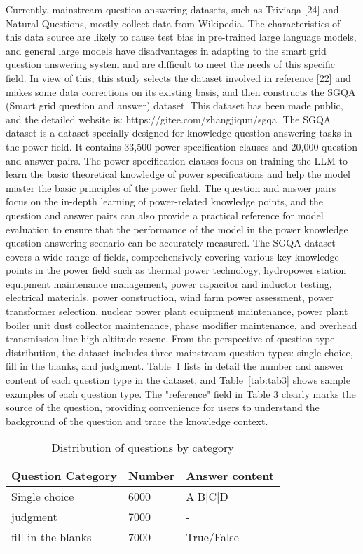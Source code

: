 Currently, mainstream question answering datasets, such as Triviaqa [24] and Natural Questions, mostly collect data from Wikipedia. The characteristics of this data source are likely to cause test bias in pre-trained large language models, and general large models have disadvantages in adapting to the smart grid question answering system and are difficult to meet the needs of this specific field.
In view of this, this study selects the dataset involved in reference [22] and makes some data corrections on its existing basis, and then constructs the SGQA (Smart grid question and answer) dataset. This dataset has been made public, and the detailed website is: https://gitee.com/zhangjiqun/sgqa.
The SGQA dataset is a dataset specially designed for knowledge question answering tasks in the power field. It contains 33,500 power specification clauses and 20,000 question and answer pairs. The power specification clauses focus on training the LLM to learn the basic theoretical knowledge of power specifications and help the model master the basic principles of the power field. The question and answer pairs focus on the in-depth learning of power-related knowledge points, and the question and answer pairs can also provide a practical reference for model evaluation to ensure that the performance of the model in the power knowledge question answering scenario can be accurately measured.
The SGQA dataset covers a wide range of fields, comprehensively covering various key knowledge points in the power field such as thermal power technology, hydropower station equipment maintenance management, power capacitor and inductor testing, electrical materials, power construction, wind farm power assessment, power transformer selection, nuclear power plant equipment maintenance, power plant boiler unit dust collector maintenance, phase modifier maintenance, and overhead transmission line high-altitude rescue. From the perspective of question type distribution, the dataset includes three mainstream question types: single choice, fill in the blanks, and judgment. Table~\ref{tab:tab2} lists in detail the number and answer content of each question type in the dataset, and Table~\ref{tab:tab3}  shows sample examples of each question type. The "reference" field in Table 3 clearly marks the source of the question, providing convenience for users to understand the background of the question and trace the knowledge context.


\begin{table}[htbp]
\centering
\caption{Distribution of questions by category}
\begin{tabular}{lll}
\toprule
Question Category & Number & Answer content \\
\midrule
Single choice & 6000 & A|B|C|D \\
judgment & 7000 & - \\
fill in the blanks & 7000 & True/False \\
\bottomrule
\end{tabular}
\label{tab:tab2}
\end{table}



